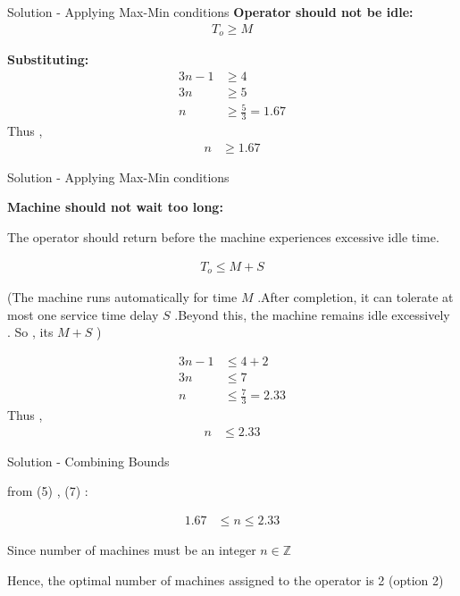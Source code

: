 \documentclass{beamer}
\begin{document}
\begin{frame}{Solution - Applying Max-Min conditions}
\textbf{Operator should not be idle:}
\begin{align}
T_o \geq M
\end{align}

\textbf{Substituting:}
\begin{align*}
3n - 1 &\geq 4 \\
3n &\geq 5 \\
n &\geq \frac{5}{3} = 1.67
\end{align*}
Thus , 
\begin{align}
    n &\geq 1.67
\end{align}
\end{frame}


\begin{frame}{Solution - Applying Max-Min conditions}

\textbf{Machine should not wait too long:}

The operator should return before the machine experiences excessive idle time.

\begin{align}
T_o \leq M + S
\end{align}

(The machine runs automatically for time $M$ .After completion, it can tolerate at most one service time delay $S$ .Beyond this, the machine remains idle excessively . So , its $M+S$ )

\begin{align*}
3n - 1 &\leq 4 + 2 \\
3n &\leq 7 \\
n &\leq \frac{7}{3} = 2.33
\end{align*}
Thus , 
\begin{align}
    n &\leq 2.33
\end{align}


\end{frame}




\begin{frame}{Solution - Combining Bounds}

from (5) , (7) :

\begin{align}
   1.67 &\leq n \leq 2.33
\end{align}

Since number of machines must be an integer $ n \in \mathbb{Z} $

Hence, the optimal number of machines assigned to the operator is 2 (option 2)
\end{frame}
\end{document}
